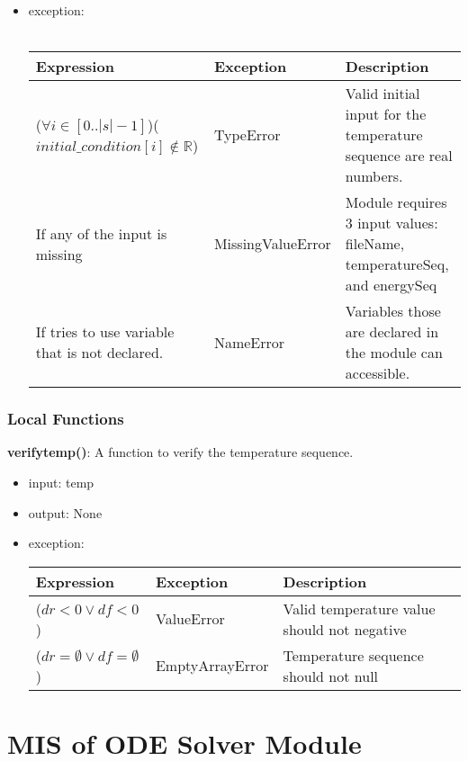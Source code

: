 \documentclass[12pt, titlepage]{article}
\begin{document}
\begin{itemize}
\item exception: \\ \\ 
 \begin{tabular}{p{7cm} p{3.5cm} p{4cm}}
 \hline
 \textbf{Expression} & \textbf{Exception} & \textbf{Description} \\
 \hline
     ($\forall i \in [0..|s|-1]$)($initial\_condition[i] \notin \mathbb{R}$) & TypeError & Valid initial input for the temperature sequence are real numbers. \\
  \hline
      If any of the input is missing  & MissingValueError & Module requires 3 input values: fileName, temperatureSeq, and energySeq \\
    \hline
    If tries to use variable that is not declared. & NameError & Variables those are declared in the module can accessible. \\
    \hline
 \end{tabular}
\end{itemize}

\subsubsection{Local Functions}

\textbf{verifytemp()}:  A function to verify the temperature sequence. 
\begin{itemize}
    \item  input: temp
    \item  output: None 
    \item  exception: \\

 \begin{tabular}{p{4.3cm} p{3.3cm} p{6cm}}
 \hline
 \textbf{Expression} & \textbf{Exception} & \textbf{Description} \\
  \hline
    ($dr < 0 \vee df < 0 $) & ValueError & Valid temperature value should not negative \\
    \hline 
    ($dr = \emptyset \vee df = \emptyset $) & EmptyArrayError &  Temperature sequence should not null \\
    \hline
 \end{tabular}
\end{itemize}


\section{MIS of ODE Solver Module} \label{ODE_Solver_Module} 
\end{document}
